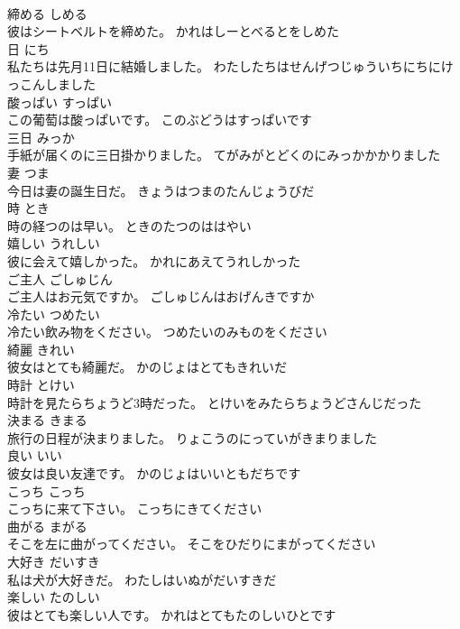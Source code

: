 \documentclass[8pt]{extreport}
\begin{document}
\begin{CJK}{UTF8}{min}
\\	締める	しめる	
\\	彼はシートベルトを締めた。	かれはしーとべるとをしめた	
\\	日	にち	
\\	私たちは先月11日に結婚しました。	わたしたちはせんげつじゅういちにちにけっこんしました	
\\	酸っぱい	すっぱい	
\\	この葡萄は酸っぱいです。	このぶどうはすっぱいです	
\\	三日	みっか	
\\	手紙が届くのに三日掛かりました。	てがみがとどくのにみっかかかりました	
\\	妻	つま	
\\	今日は妻の誕生日だ。	きょうはつまのたんじょうびだ	
\\	時	とき	
\\	時の経つのは早い。	ときのたつのははやい	
\\	嬉しい	うれしい	
\\	彼に会えて嬉しかった。	かれにあえてうれしかった	
\\	ご主人	ごしゅじん	
\\	ご主人はお元気ですか。	ごしゅじんはおげんきですか	
\\	冷たい	つめたい	
\\	冷たい飲み物をください。	つめたいのみものをください	
\\	綺麗	きれい	
\\	彼女はとても綺麗だ。	かのじょはとてもきれいだ	
\\	時計	とけい	
\\	時計を見たらちょうど3時だった。	とけいをみたらちょうどさんじだった	
\\	決まる	きまる	
\\	旅行の日程が決まりました。	りょこうのにっていがきまりました	
\\	良い	いい	
\\	彼女は良い友達です。	かのじょはいいともだちです	
\\	こっち	こっち	
\\	こっちに来て下さい。	こっちにきてください	
\\	曲がる	まがる	
\\	そこを左に曲がってください。	そこをひだりにまがってください	
\\	大好き	だいすき	
\\	私は犬が大好きだ。	わたしはいぬがだいすきだ	
\\	楽しい	たのしい	
\\	彼はとても楽しい人です。	かれはとてもたのしいひとです	

\end{CJK}
\end{document}
